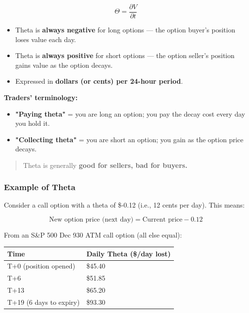 \documentclass[12pt,openany]{book}
\begin{document}
\[
\Theta = \frac{\partial V}{\partial t}
\]

\begin{itemize}[leftmargin=*]
    \item Theta is \textbf{always negative} for long options — the option buyer's position loses value each day.
    \item Theta is \textbf{always positive} for short options — the option seller's position gains value as the option decays.
    \item Expressed in \textbf{dollars (or cents) per 24-hour period}.
\end{itemize}

\textbf{Traders' terminology:}
\begin{itemize}[leftmargin=*]
    \item \textbf{"Paying theta"} = you are long an option; you pay the decay cost every day you hold it.
    \item \textbf{"Collecting theta"} = you are short an option; you gain as the option price decays.
\end{itemize}

\begin{quote}
Theta is generally \textbf{good for sellers, bad for buyers.}
\end{quote}

\subsubsection{Example of Theta}

Consider a call option with a theta of \$-0.12 (i.e., 12 cents per day). This means:

\[
\text{New option price (next day)} = \text{Current price} - 0.12
\]

From an S\&P 500 Dec 930 ATM call option (all else equal):

\begin{center}
\scriptsize
\setlength{\tabcolsep}{3pt}
\begin{tabular}{|L{6.3cm}|L{6.3cm}|}
\hline
\textbf{Time} & \textbf{Daily Theta (\$/day lost)} \\
\hline
T+0 (position opened) & \$45.40 \\
\hline
T+6 & \$51.85 \\
\hline
T+13 & \$65.20 \\
\hline
T+19 (6 days to expiry) & \$93.30 \\
\hline
\end{tabular}
\end{center}
\end{document}
